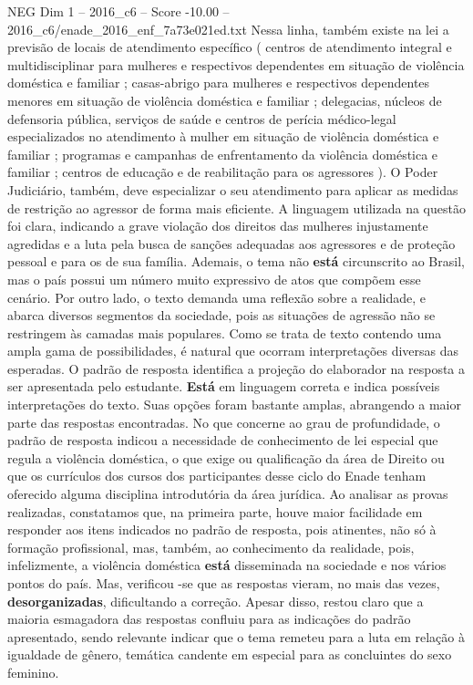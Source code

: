 \begin{textsample}{NEG Dim 1 – 2016\_c6 – Score -10.00 – 2016\_c6/enade\_2016\_enf\_7a73e021ed.txt}
Nessa linha, também existe na lei a previsão de locais de atendimento específico ( centros de atendimento integral e multidisciplinar para mulheres e respectivos dependentes em situação de violência doméstica e familiar ; casas-abrigo para mulheres e respectivos dependentes menores em situação de violência doméstica e familiar ; delegacias, núcleos de defensoria pública, serviços de saúde e centros de perícia médico-legal especializados no atendimento à mulher em situação de violência doméstica e familiar ; programas e campanhas de enfrentamento da violência doméstica e familiar ; centros de educação e de reabilitação para os agressores ).
O Poder Judiciário, também, deve especializar o seu atendimento para aplicar as medidas de restrição ao agressor de forma mais eficiente.
A linguagem utilizada na questão foi clara, indicando a grave violação dos direitos das mulheres injustamente agredidas e a luta pela busca de sanções adequadas aos agressores e de proteção pessoal e para os de sua família.
Ademais, o tema não \textbf{está} circunscrito ao Brasil, mas o país possui um número muito expressivo de atos que compõem esse cenário.
Por outro lado, o texto demanda uma reflexão sobre a realidade, e abarca diversos segmentos da sociedade, pois as situações de agressão não se restringem às camadas mais populares.
Como se trata de texto contendo uma ampla gama de possibilidades, é natural que ocorram interpretações diversas das esperadas.
O padrão de resposta identifica a projeção do elaborador na resposta a ser apresentada pelo estudante. \textbf{Está} em linguagem correta e indica possíveis interpretações do texto.
Suas opções foram bastante amplas, abrangendo a maior parte das respostas encontradas.
No que concerne ao grau de profundidade, o padrão de resposta indicou a necessidade de conhecimento de lei especial que regula a violência doméstica, o que exige ou qualificação da área de Direito ou que os currículos dos cursos dos participantes desse ciclo do Enade tenham oferecido alguma disciplina introdutória da área jurídica.
Ao analisar as provas realizadas, constatamos que, na primeira parte, houve maior facilidade em responder aos itens indicados no padrão de resposta, pois atinentes, não só à formação profissional, mas, também, ao conhecimento da realidade, pois, infelizmente, a violência doméstica \textbf{está} disseminada na sociedade e nos vários pontos do país.
Mas, verificou -se que as respostas vieram, no mais das vezes, \textbf{desorganizadas}, dificultando a correção.
Apesar disso, restou claro que a maioria esmagadora das respostas confluiu para as indicações do padrão apresentado, sendo relevante indicar que o tema remeteu para a luta em relação à igualdade de gênero, temática candente em especial para as concluintes do sexo feminino.

\end{textsample}
